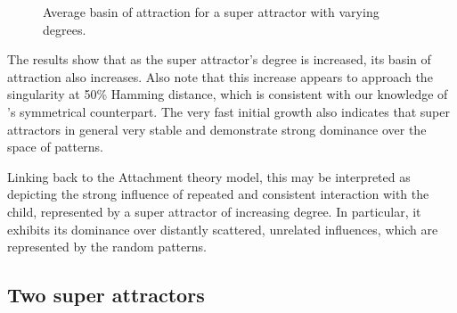 \begin{figure}[h]
  \centering

\caption{Average basin of attraction for a super attractor with varying degrees.}
\label{fig:one super plot}
\end{figure}


The results show that as the super attractor's degree is increased, its basin of attraction also increases. Also note that this increase appears to approach the singularity at 50\% Hamming distance, which is consistent with our knowledge of \psuper's symmetrical counterpart. The very fast initial growth also indicates that super attractors in general very stable and demonstrate strong dominance over the space of patterns.


Linking back to the Attachment theory model, this may be interpreted as depicting the strong influence of repeated and consistent interaction with the child, represented by a super attractor of increasing degree. In particular, it exhibits its dominance over distantly scattered, unrelated influences, which are represented by the random patterns.



\subsection{Two super attractors}


\newcommand{\poriginsuper}{$p_{origin}$}
\newcommand{\pnewsuper}{$p_{new}$}
\newcommand{\dorigin}{$d_{origin}$}
\newcommand{\dnew}{$d_{new}$}

